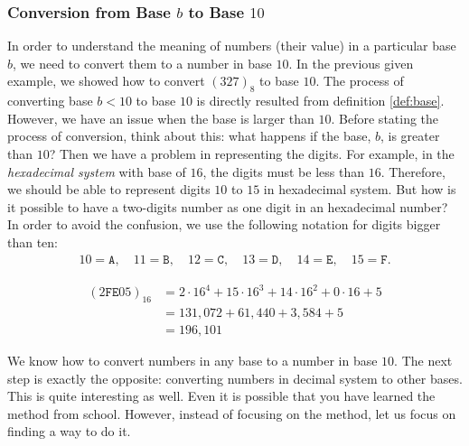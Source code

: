 \subsubsection{Conversion from Base $b$ to Base $10$}
In order to understand the meaning of numbers (their value) in a particular base $b$, we need to convert them to a number in base $10$. In the previous given example, we showed how to convert $(327)_8$ to base $10$. The process of converting base $b<10$ to base $10$ is directly resulted from definition \eqref{def:base}. However, we have an issue when the base is larger than $10$. Before stating the process of conversion, think about this: what happens if the base, $b$, is greater than $10$? Then we have a problem in representing the digits. For example, in the \textit{hexadecimal system} with base of $16$, the digits must be less than $16$. Therefore, we should be able to represent digits $10$ to $15$ in hexadecimal system. But how is it possible to have a two-digits number as one digit in an hexadecimal number? In order to avoid the confusion, we use the following notation for digits bigger than ten:
\begin{align*}
	10 = \mathtt{A}, \quad 11 = \mathtt{B}, \quad 12 = \mathtt{C}, \quad 13 = \mathtt{D}, \quad 14 = \mathtt{E}, \quad 15 = \mathtt{F}.
\end{align*}

\begin{example}
	\begin{align*}
		(2\mathtt{F}\mathtt{E}05)_{16} & = 2 \cdot 16^4 + 15 \cdot 16^3 + 14 \cdot 16^2 + 0 \cdot 16 + 5 \\
		& = 131,072 + 61,440 + 3,584 + 5\\
		& = 196,101
	\end{align*}
\end{example}
We know how to convert numbers in any base to a number in base $10$. The next step is exactly the opposite: converting numbers in decimal system to other bases. This is quite interesting as well. Even it is possible that you have learned the method from school. However, instead of focusing on the method, let us focus on finding a way to do it.
